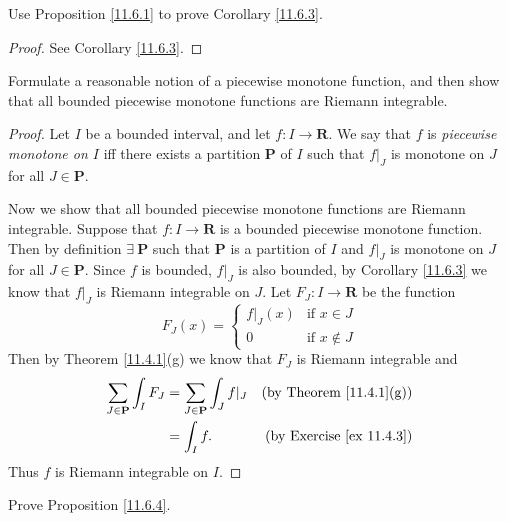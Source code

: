 \exercisesection

\begin{exercise}\label{ex 11.6.1}
    Use Proposition \ref{11.6.1} to prove Corollary \ref{11.6.3}.
\end{exercise}

\begin{proof}
    See Corollary \ref{11.6.3}.
\end{proof}

\begin{exercise}\label{ex 11.6.2}
    Formulate a reasonable notion of a piecewise monotone function, and then show that all bounded piecewise monotone functions are Riemann integrable.
\end{exercise}

\begin{proof}
    Let \(I\) be a bounded interval, and let \(f : I \to \mathbf{R}\).
    We say that \(f\) is \emph{piecewise monotone on \(I\)} iff there exists a partition \(\mathbf{P}\) of \(I\) such that \(f|_J\) is monotone on \(J\) for all \(J \in \mathbf{P}\).

    Now we show that all bounded piecewise monotone functions are Riemann integrable.
    Suppose that \(f : I \to \mathbf{R}\) is a bounded piecewise monotone function.
    Then by definition \(\exists\ \mathbf{P}\) such that \(\mathbf{P}\) is a partition of \(I\) and \(f|_J\) is monotone on \(J\) for all \(J \in \mathbf{P}\).
    Since \(f\) is bounded, \(f|_J\) is also bounded, by Corollary \ref{11.6.3} we know that \(f|_J\) is Riemann integrable on \(J\).
    Let \(F_J : I \to \mathbf{R}\) be the function
    \[
        F_J(x) = \begin{cases}
            f|_J(x) & \text{if } x \in J    \\
            0       & \text{if } x \notin J
        \end{cases}
    \]
    Then by Theorem \ref{11.4.1}(g) we know that \(F_J\) is Riemann integrable and
    \begin{align*}
        \sum_{J \in \mathbf{P}} \int_I F_J & = \sum_{J \in \mathbf{P}} \int_J f|_J & \text{(by Theorem \ref{11.4.1}(g))}  \\
                                           & = \int_I f.                           & \text{(by Exercise \ref{ex 11.4.3})}
    \end{align*}
    Thus \(f\) is Riemann integrable on \(I\).
\end{proof}

\begin{exercise}\label{ex 11.6.3}
    Prove Proposition \ref{11.6.4}.
\end{exercise}

